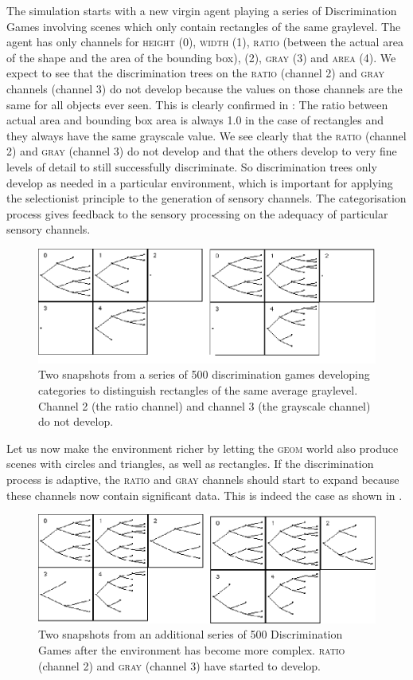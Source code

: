 The simulation starts with a new virgin agent 
playing a series of Discrimination Games involving scenes
which only contain rectangles of the same graylevel. 
The agent has only channels for \textsc{height} (0), \textsc{width} (1), 
\textsc{ratio} (between the actual area of the shape 
and the area of the bounding box),
(2), \textsc{gray} (3) and \textsc{area} (4). We expect
to see that the discrimination trees on the \textsc{ratio} (channel 
2) and \textsc{gray} channels (channel 3) do not develop because 
the values on those channels 
are the same for all objects ever seen. This is 
clearly confirmed in : The ratio
between actual area and bounding box area is always 1.0
in the case of rectangles and they always have the same
grayscale value. 
We see clearly that the \textsc{ratio} (channel 2) and \textsc{gray} (channel 3) 
do not develop and that the others develop to very 
fine levels of detail to still successfully discriminate. 
So discrimination trees only 
develop as needed in a particular environment, which is 
important for applying the selectionist
principle to the generation of sensory channels. 
The categorisation process gives feedback to 
the sensory processing on the adequacy of particular sensory 
channels. 

\begin{figure}[htbp]
  \centerline{\includegraphics[width=.65\textwidth]{chap4/figs/adptwrl1.pdf}}
\caption{\label{adptwrl1}Two snapshots 
from a series of 500 discrimination 
games developing categories to distinguish rectangles of 
the same average graylevel. Channel 2 (the ratio channel) 
and channel 3 (the grayscale channel) do not develop.}
\end{figure}

Let us now make the environment richer by letting the 
\textsc{geom} world also produce scenes with circles and triangles, 
as well as rectangles. If the discrimination 
process is adaptive, the \textsc{ratio} and \textsc{gray} channels should
start to expand because these channels now contain
significant data. This is indeed the case as shown 
in . 

\begin{figure}[htbp]
  \centerline{\includegraphics[width=.65\textwidth]{chap4/figs/adptwrl2.pdf}}
\caption{\label{adptwrl2}Two snapshots from 
an additional series of 500 Discrimination Games after
the environment has become more complex. \textsc{ratio}
(channel 2) and \textsc{gray} (channel 3) have started to develop.}
\end{figure}

